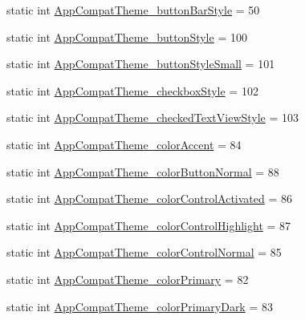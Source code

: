 \begin{DoxyCompactItemize}
\item 
static int \hyperlink{classandroid_1_1support_1_1v7_1_1mediarouter_1_1R_1_1styleable_af5a3bc9fc8ba28ff915f6087ef908076}{App\+Compat\+Theme\+\_\+button\+Bar\+Style} = 50
\item 
static int \hyperlink{classandroid_1_1support_1_1v7_1_1mediarouter_1_1R_1_1styleable_ad16bbba5da5476638832d9e2a54b7abe}{App\+Compat\+Theme\+\_\+button\+Style} = 100
\item 
static int \hyperlink{classandroid_1_1support_1_1v7_1_1mediarouter_1_1R_1_1styleable_aec6eece48285252661fdccd6314fc69a}{App\+Compat\+Theme\+\_\+button\+Style\+Small} = 101
\item 
static int \hyperlink{classandroid_1_1support_1_1v7_1_1mediarouter_1_1R_1_1styleable_a2149fa776964dfd41a14357ea2f3c8c5}{App\+Compat\+Theme\+\_\+checkbox\+Style} = 102
\item 
static int \hyperlink{classandroid_1_1support_1_1v7_1_1mediarouter_1_1R_1_1styleable_a3664100d2a81d9957c8aea792d6b8c56}{App\+Compat\+Theme\+\_\+checked\+Text\+View\+Style} = 103
\item 
static int \hyperlink{classandroid_1_1support_1_1v7_1_1mediarouter_1_1R_1_1styleable_a8579a8f66a19549046fe28ca6a0b001b}{App\+Compat\+Theme\+\_\+color\+Accent} = 84
\item 
static int \hyperlink{classandroid_1_1support_1_1v7_1_1mediarouter_1_1R_1_1styleable_a2e67b376287180b911f79e22da40a678}{App\+Compat\+Theme\+\_\+color\+Button\+Normal} = 88
\item 
static int \hyperlink{classandroid_1_1support_1_1v7_1_1mediarouter_1_1R_1_1styleable_a4af1f042778d9a39c7755e8d349bfbe2}{App\+Compat\+Theme\+\_\+color\+Control\+Activated} = 86
\item 
static int \hyperlink{classandroid_1_1support_1_1v7_1_1mediarouter_1_1R_1_1styleable_a3101d4c220b1624630e177adbcb5bed1}{App\+Compat\+Theme\+\_\+color\+Control\+Highlight} = 87
\item 
static int \hyperlink{classandroid_1_1support_1_1v7_1_1mediarouter_1_1R_1_1styleable_a5fa81c05a9dc3325bf0d8bb56ae34321}{App\+Compat\+Theme\+\_\+color\+Control\+Normal} = 85
\item 
static int \hyperlink{classandroid_1_1support_1_1v7_1_1mediarouter_1_1R_1_1styleable_a0c6a69062686746906fdbde03f24524b}{App\+Compat\+Theme\+\_\+color\+Primary} = 82
\item 
static int \hyperlink{classandroid_1_1support_1_1v7_1_1mediarouter_1_1R_1_1styleable_a68da362e86b61e6a4cd581ac84979e66}{App\+Compat\+Theme\+\_\+color\+Primary\+Dark} = 83

\end{DoxyCompactItemize}
